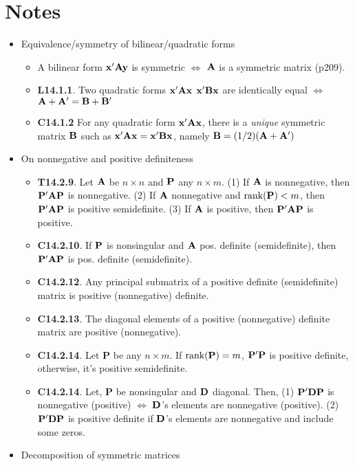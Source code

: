 \documentclass[a4paper, oneside]{book}
\begin{document}
\section{Notes}
\begin{itemize}
\item Equivalence/symmetry of bilinear/quadratic forms
	\begin{itemize}
	\item A bilinear form $\mathbf{x'Ay}$ is symmetric $\iff$ $\mathbf{A}$ is a symmetric matrix (p209).
	\item \textbf{L14.1.1}. Two quadratic forms $\mathbf{x'Ax}$  $\mathbf{x'Bx}$ are identically equal $\iff$ $\mathbf{A+A'=B+B'}$ 
	\item \textbf{C14.1.2} For any quadratic form $\mathbf{x'Ax}$, there is a \textit{unique} symmetric matrix $\mathbf{B}$ such as $\mathbf{x'Ax=x'Bx}$, namely $\mathbf{B}=(1/2)\mathbf{(A+A')}$
 	\end{itemize}
\item On nonnegative and positive definiteness
	\begin{itemize}
	\item \textbf{T14.2.9}. Let $\mathbf{A}$ be $n\times n$ and $\mathbf{P}$ any $n\times m$. (1) If $\mathbf{A}$ is nonnegative, then $\mathbf{P'AP}$ is nonnegative. (2) If $\mathbf{A}$ nonnegative and $\text{rank}(\mathbf{P})<m$, then $\mathbf{P'AP}$ is positive semidefinite. (3) If $\mathbf{A}$ is positive, then $\mathbf{P'AP}$ is positive.
	\item \textbf{C14.2.10}. If $\mathbf{P}$ is nonsingular and $\mathbf{A}$ pos. definite (semidefinite), then $\mathbf{P'AP}$ is pos. definite (semidefinite).
	\item \textbf{C14.2.12}. Any principal submatrix of a positive definite (semidefinite) matrix is positive (nonnegative) definite.
	\item \textbf{C14.2.13}. The diagonal elements of a positive (nonnegative) definite matrix are positive (nonnegative).
	\item \textbf{C14.2.14}. Let $\textbf{P}$ be any $n\times m$. If $\text{rank}(\mathbf{P})=m$, $\mathbf{P'P}$ is positive definite, otherwise, it's positive semidefinite. 
	\item \textbf{C14.2.14}. Let, $\textbf{P}$ be nonsingular and $\mathbf{D}$ diagonal. Then, (1) $\mathbf{P'DP}$ is nonnegative (positive) $\iff$ $\mathbf{D}$'s elements are nonnegative (positive). (2) $\mathbf{P'DP}$ is positive definite if $\mathbf D$'s elements are nonnegative and include some zeros.
	\end{itemize}
\item Decomposition of symmetric matrices

\end{itemize}
\end{document}
